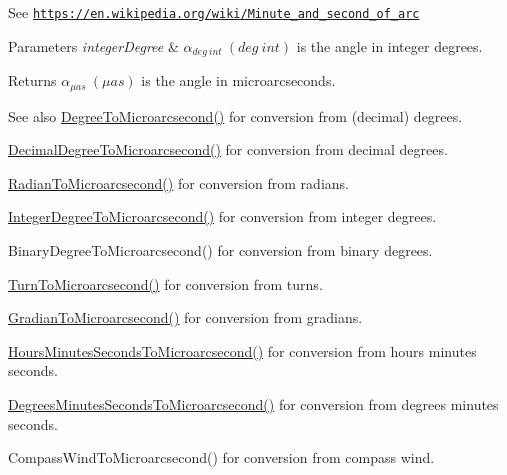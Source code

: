See \href{https://en.wikipedia.org/wiki/Minute_and_second_of_arc}{\tt https\+://en.\+wikipedia.\+org/wiki/\+Minute\+\_\+and\+\_\+second\+\_\+of\+\_\+arc} 
\begin{DoxyParams}{Parameters}
{\em integer\+Degree} & $\alpha_{deg\ int}\ (deg\ int)$ is the angle in integer degrees. \\
\hline
\end{DoxyParams}
\begin{DoxyReturn}{Returns}
$\alpha_{\mu as}\ (\mu as)$ is the angle in microarcseconds. 
\end{DoxyReturn}
\begin{DoxySeeAlso}{See also}
\mbox{\hyperlink{group___e_g_x_math-_angle_conversions-_degree_ga31b65388fe1b4656663b3d66b9d764e6}{Degree\+To\+Microarcsecond()}} for conversion from (decimal) degrees. 

\mbox{\hyperlink{group___e_g_x_math-_angle_conversions-_decimal_degree_ga6fa88456069907fd24716fa575517571}{Decimal\+Degree\+To\+Microarcsecond()}} for conversion from decimal degrees. 

\mbox{\hyperlink{group___e_g_x_math-_angle_conversions-_radian_ga3a515ca2838a305fa40750763f546a86}{Radian\+To\+Microarcsecond()}} for conversion from radians. 

\mbox{\hyperlink{group___e_g_x_math-_angle_conversions-_integer_degree_ga69179d6082764595c7014805e1f6b31e}{Integer\+Degree\+To\+Microarcsecond()}} for conversion from integer degrees. 

Binary\+Degree\+To\+Microarcsecond() for conversion from binary degrees. 

\mbox{\hyperlink{group___e_g_x_math-_angle_conversions-_turn_ga41a861a04d65aab05647b32142e6d80d}{Turn\+To\+Microarcsecond()}} for conversion from turns. 

\mbox{\hyperlink{group___e_g_x_math-_angle_conversions-_gradian_gab7781c860ea3ab9c9cf76ab639846a07}{Gradian\+To\+Microarcsecond()}} for conversion from gradians. 

\mbox{\hyperlink{group___e_g_x_math-_angle_conversions-_hours_minutes_seconds_ga061e4fa10d73e459d5f411cfe436bbe3}{Hours\+Minutes\+Seconds\+To\+Microarcsecond()}} for conversion from hours minutes seconds. 

\mbox{\hyperlink{group___e_g_x_math-_angle_conversions-_degrees_minutes_seconds_gabc4de7934e776de13953707344a4da88}{Degrees\+Minutes\+Seconds\+To\+Microarcsecond()}} for conversion from degrees minutes seconds. 

Compass\+Wind\+To\+Microarcsecond() for conversion from compass wind. 
\end{DoxySeeAlso}
\mbox{\label{group___e_g_x_math-_angle_conversions-_integer_degree_gadc43f22e832cd8fcf16b7bd2269ae348}} 
